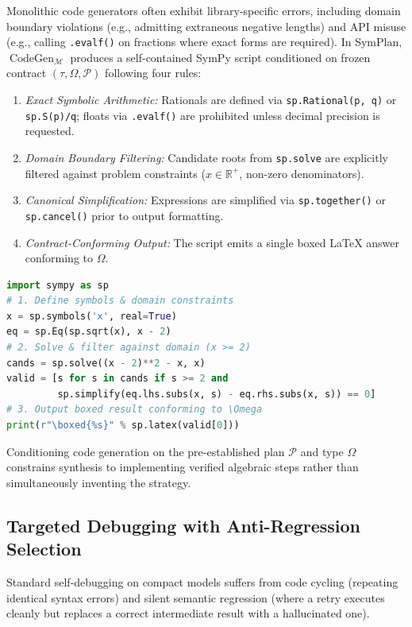 \documentclass[conference,a4paper]{IEEEtran}
\begin{document}
Monolithic code generators often exhibit library-specific errors, including domain boundary violations (e.g., admitting extraneous negative lengths) and API misuse (e.g., calling \texttt{.evalf()} on fractions where exact forms are required).
In SymPlan, $\operatorname{CodeGen}_{\mathcal{M}}$ produces a self-contained SymPy script conditioned on frozen contract $(\tau, \Omega, \mathcal{P})$ following four rules:
\begin{enumerate}
    \item \textit{Exact Symbolic Arithmetic:} Rationals are defined via \texttt{sp.Rational(p, q)} or \texttt{sp.S(p)/q}; floats via \texttt{.evalf()} are prohibited unless decimal precision is requested.
    \item \textit{Domain Boundary Filtering:} Candidate roots from \texttt{sp.solve} are explicitly filtered against problem constraints ($x \in \mathbb{R}^+$, non-zero denominators).
    \item \textit{Canonical Simplification:} Expressions are simplified via \texttt{sp.together()} or \texttt{sp.cancel()} prior to output formatting.
    \item \textit{Contract-Conforming Output:} The script emits a single boxed \LaTeX{} answer conforming to $\Omega$.
\end{enumerate}

\begin{lstlisting}[style=promptstyle,language=Python]
import sympy as sp
# 1. Define symbols & domain constraints
x = sp.symbols('x', real=True)
eq = sp.Eq(sp.sqrt(x), x - 2)
# 2. Solve & filter against domain (x >= 2)
cands = sp.solve((x - 2)**2 - x, x)
valid = [s for s in cands if s >= 2 and 
         sp.simplify(eq.lhs.subs(x, s) - eq.rhs.subs(x, s)) == 0]
# 3. Output boxed result conforming to \Omega
print(r"\boxed{%s}" % sp.latex(valid[0]))
\end{lstlisting}

Conditioning code generation on the pre-established plan $\mathcal{P}$ and type $\Omega$ constrains synthesis to implementing verified algebraic steps rather than simultaneously inventing the strategy.

\subsection{Targeted Debugging with Anti-Regression Selection}
\label{sec:debugging}

Standard self-debugging on compact models suffers from code cycling (repeating identical syntax errors) and silent semantic regression (where a retry executes cleanly but replaces a correct intermediate result with a hallucinated one).
\end{document}
